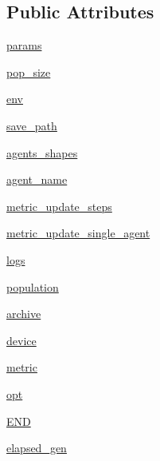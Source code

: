 \subsection*{Public Attributes}
\begin{DoxyCompactItemize}
\item 
\hyperlink{classtaxons_1_1core_1_1rnd__qd_1_1_rnd_q_d_ab7883ce78f8f699d4a2950128bf6dcbb}{params}
\item 
\hyperlink{classtaxons_1_1core_1_1rnd__qd_1_1_rnd_q_d_acdb4373d63480ea935f930d1922a00ed}{pop\+\_\+size}
\item 
\hyperlink{classtaxons_1_1core_1_1rnd__qd_1_1_rnd_q_d_ac40785dcd2906a6fe7a45e7de8b07a5a}{env}
\item 
\hyperlink{classtaxons_1_1core_1_1rnd__qd_1_1_rnd_q_d_a5a167ccb3dc6197892bd2e87d8d239ef}{save\+\_\+path}
\item 
\hyperlink{classtaxons_1_1core_1_1rnd__qd_1_1_rnd_q_d_aa7f08b733c92f21da2d9345ec100b09a}{agents\+\_\+shapes}
\item 
\hyperlink{classtaxons_1_1core_1_1rnd__qd_1_1_rnd_q_d_a150e04d7495bc1afafb9fdaa495a7684}{agent\+\_\+name}
\item 
\hyperlink{classtaxons_1_1core_1_1rnd__qd_1_1_rnd_q_d_aa66af5f50dfa29748f19fccfa18f0d59}{metric\+\_\+update\+\_\+steps}
\item 
\hyperlink{classtaxons_1_1core_1_1rnd__qd_1_1_rnd_q_d_a8cad1d48c03d9b1f44dd817f29135bad}{metric\+\_\+update\+\_\+single\+\_\+agent}
\item 
\hyperlink{classtaxons_1_1core_1_1rnd__qd_1_1_rnd_q_d_a4ed20f8209c052734f6e1d08079fe68b}{logs}
\item 
\hyperlink{classtaxons_1_1core_1_1rnd__qd_1_1_rnd_q_d_a26536113a3e06d86037d64aa7cd6336f}{population}
\item 
\hyperlink{classtaxons_1_1core_1_1rnd__qd_1_1_rnd_q_d_af5518d3860fce8b723a8977518091085}{archive}
\item 
\hyperlink{classtaxons_1_1core_1_1rnd__qd_1_1_rnd_q_d_aea13bc6639536088ee767a9b8e68c830}{device}
\item 
\hyperlink{classtaxons_1_1core_1_1rnd__qd_1_1_rnd_q_d_aa15c9775bf16197d3830564c32e944a5}{metric}
\item 
\hyperlink{classtaxons_1_1core_1_1rnd__qd_1_1_rnd_q_d_a35a976b81e305c4fb4bfea2588d35e80}{opt}
\item 
\hyperlink{classtaxons_1_1core_1_1rnd__qd_1_1_rnd_q_d_a90aca0981625286d8373507bd2510131}{E\+ND}
\item 
\hyperlink{classtaxons_1_1core_1_1rnd__qd_1_1_rnd_q_d_a93ff368be04238184a156b807facc718}{elapsed\+\_\+gen}
\end{DoxyCompactItemize}


